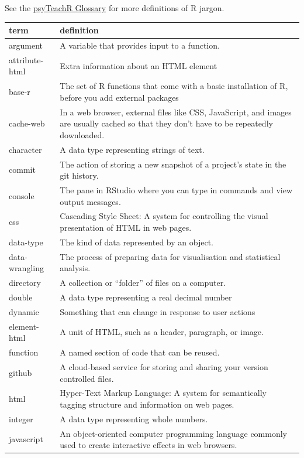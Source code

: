 \documentclass[
]{book}
\begin{document}
See the \href{https://psyteachr.github.io/glossary/}{psyTeachR Glossary} for more definitions of R jargon.

\begin{tabular}{l|l}
\hline
term & definition\\
\hline
argument & A variable that provides input to a function.\\
\hline
attribute-html & Extra information about an HTML element\\
\hline
base-r & The set of R functions that come with a basic installation of R, before you add external packages\\
\hline
cache-web & In a web browser, external files like CSS, JavaScript, and images are usually cached so that they don’t have to be repeatedly downloaded.\\
\hline
character & A data type representing strings of text.\\
\hline
commit & The action of storing a new snapshot of a project’s state in the git history.\\
\hline
console & The pane in RStudio where you can type in commands and view output messages.\\
\hline
css & Cascading Style Sheet: A system for controlling the visual presentation of HTML in web pages.\\
\hline
data-type & The kind of data represented by an object.\\
\hline
data-wrangling & The process of preparing data for visualisation and statistical analysis.\\
\hline
directory & A collection or “folder” of files on a computer.\\
\hline
double & A data type representing a real decimal number\\
\hline
dynamic & Something that can change in response to user actions\\
\hline
element-html & A unit of HTML, such as a header, paragraph, or image.\\
\hline
function & A named section of code that can be reused.\\
\hline
github & A cloud-based service for storing and sharing your version controlled files.\\
\hline
html & Hyper-Text Markup Language: A system for semantically tagging structure and information on web pages.\\
\hline
integer & A data type representing whole numbers.\\
\hline
javascript & An object-oriented computer programming language commonly used to create interactive effects in web browsers.\\

\end{tabular}
\end{document}
